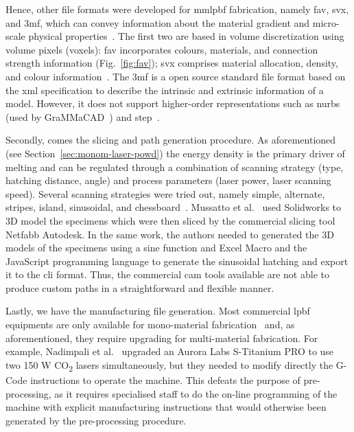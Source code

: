 Hence, other file formats were developed for \gls{mmlpbf} fabrication, namely \gls{fav},
\gls{svx}, and \gls{3mf}, which can convey information about the material
gradient and micro-scale physical properties~\cite{loh2018overview}. The first
two are based in volume discretization using volume pixels (voxels): \gls{fav}
incorporates colours, materials, and connection strength information (Fig.~\ref{fig:fav}); \gls{svx}
comprises material allocation, density, and colour information~\cite{wang2022recent}. The \gls{3mf}
is a open source standard file format based on the \gls{xml} specification to
describe the intrinsic and extrinsic information of a model. However, it does
not support higher-order representations such as \gls{nurbs} (used by
GraMMaCAD~\cite{grammacad}) and \gls{step}~\cite{wang2022recent}.

Secondly, comes the slicing and path generation procedure. As aforementioned
(see Section~\ref{sec:monom-laser-powd}) the energy density is the primary
driver of melting and can be regulated through a combination of scanning
strategy (type, hatching distance, angle) and process parameters (laser power, laser
scanning speed). Several scanning strategies were tried out, namely simple,
alternate, stripes, island, sinusoidal, and
chessboard~\cite{obeidi2022LPBFGuidelines, wang2022recent}. Mussatto et
al.~\cite{mussatto2022laser} used Solidworks to 3D model the specimens which
were then sliced by the commercial slicing tool Netfabb Autodesk. In the same
work, the authors needed to generated the 3D models of the specimens using a
sine function and Excel Macro and the JavaScript programming language to
generate the sinusoidal hatching and export it to the \gls{cli} format.
Thus, the commercial \gls{cam} tools available are not able to produce custom
paths in a straightforward and flexible manner.

Lastly, we have the manufacturing file generation. Most commercial \gls{lpbf}
equipments are only available for mono-material fabrication~\cite{mussatto2022research} and, as
aforementioned, they require upgrading for multi-material fabrication. For
example, Nadimpali et al.~\cite{nadimpali2019MMSteels} upgraded an Aurora Labs
S-Titanium PRO to use two 150 W CO\textsubscript{2} lasers
simultaneously, but they needed to modify directly the G-Code instructions to
operate the machine. This defeats the purpose of pre-processing, as it requires
specialised staff to do the on-line programming of the machine with explicit
manufacturing instructions that would otherwise been generated by the
pre-processing procedure.

